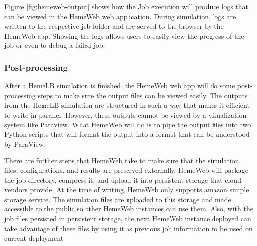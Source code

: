 \vspace{1cm}

\noindent%
\begin{minipage}{\linewidth}%
\label{fig:hemeweb-output}%
\end{minipage}

\vspace{1cm}

Figure \ref{fig:hemeweb-output} shows how the Job execution will produce logs that can be viewed in the HemeWeb web application. During simulation, logs are written to the respective job folder and are served to the browser by the HemeWeb app. Showing the logs allows users to easily view the progress of the job or even to debug a failed job.


\subsubsection{Post-processing}

After a HemeLB simulation is finished, the HemeWeb web app will do some post-processing steps to make sure the output files can be viewed easily. The outputs from the HemeLB simulation are structured in such a way that makes it efficient to write in parallel. However, these outputs cannot be viewed by a visualization system like Paraview. What HemeWeb will do is to pipe the output files into two Python scripts that will format the output into a format that can be understood by ParaView.


There are further steps that HemeWeb take to make sure that the simulation files, configurations, and results are preserved externally. HemeWeb will package the job directory, compress it, and upload it into persistent storage that cloud vendors provide. At the time of writing, HemeWeb only supports amazon simple storage service. The simulation files are uploaded to this storage and made accessible to the public so other HemeWeb instances can use them. Also, with the job files persisted in persistent storage, the next HemeWeb instance deployed can take advantage of these files by using it as previous job information to be used on current deployment






